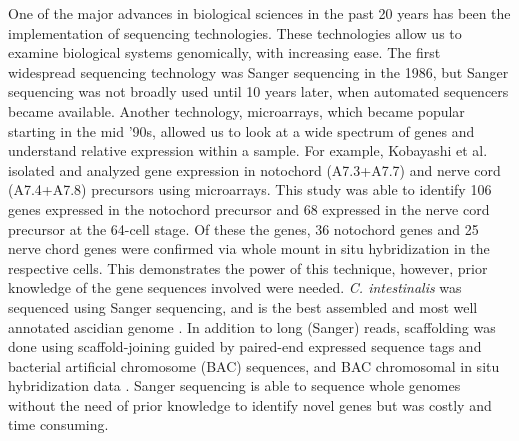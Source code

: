 One of the major advances in biological sciences in the past 20 years has been the implementation of sequencing technologies. These technologies allow us to examine biological systems genomically, with increasing ease. The first widespread sequencing technology was Sanger sequencing in the 1986, but Sanger sequencing was not broadly used until 10 years later, when automated sequencers became available. Another technology, microarrays, which became popular starting in the mid '90s, allowed us to look at a wide spectrum of genes and understand relative expression within a sample. For example, Kobayashi et al. \cite{kobayashi_differential_2013} isolated and analyzed gene expression in notochord (A7.3+A7.7) and nerve cord (A7.4+A7.8) precursors using microarrays. This study was able to identify 106 genes expressed in the notochord precursor and 68 expressed in the nerve cord precursor at the 64-cell stage. Of these the genes, 36 notochord genes and 25 nerve chord genes were confirmed via whole mount in situ hybridization in the respective cells. This demonstrates the power of this technique, however, prior knowledge of the gene sequences involved were needed. \textit{C. intestinalis} was sequenced using Sanger sequencing, and is the best assembled and most well annotated ascidian genome \cite{dehal_draft_2002}. In addition to long (Sanger) reads, scaffolding was done using scaffold-joining guided by paired-end expressed sequence tags and bacterial artificial chromosome (BAC) sequences, and BAC chromosomal in situ hybridization data \cite{satou_improved_2008}. Sanger sequencing is able to sequence whole genomes without the need of prior knowledge to identify novel genes but was costly and time consuming\cite{metzker_emerging_2005,liu_comparison_2012}. 

